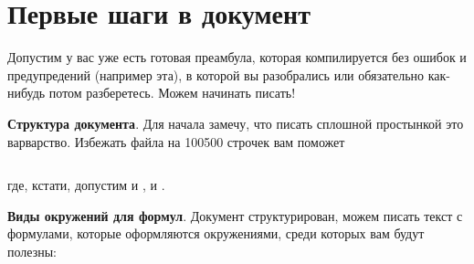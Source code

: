 

\section*{Первые шаги в документ}


Допустим у вас уже есть готовая преамбула, которая компилируется без ошибок и предупредений (например эта), в которой вы разобрались или обязательно как-нибудь потом разберетесь. Можем начинать писать!

\textbf{Структура документа}. 
Для начала замечу, что писать сплошной простынкой это варварство. Избежать файла на 100500 строчек вам поможет
\begin{lstlisting}

\end{lstlisting}
где, кстати, допустим и , и .


\textbf{Виды окружений для формул}. Документ структурирован, можем писать текст с формулами, которые оформляются окружениями, среди которых вам будут полезны:



